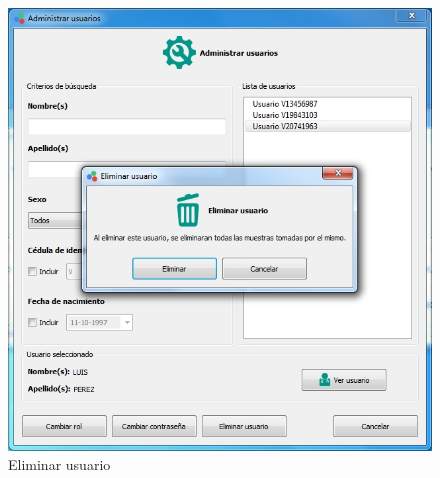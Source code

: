 \begin{figure}[H]
  \centering
  \includegraphics[width=1\linewidth]{./img/administrar-eliminar.jpg}
\caption[]{Eliminar usuario\label{fig:eliminar-usuario}}
\end{figure}
\newpage
\renewcommand{\anchotabla}{16.5cm}
\renewcommand{\altocelda}{2pt}
